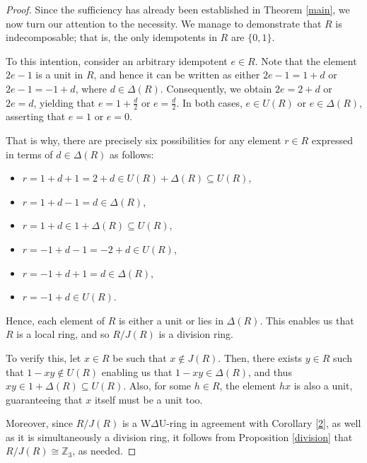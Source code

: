 \documentclass[10pt,a4paper]{amsart}
\begin{document}
\begin{proof}
Since the sufficiency has already been established in Theorem \ref{main}, we now turn our attention to the necessity. We manage to demonstrate that \( R \) is indecomposable; that is, the only idempotents in \( R \) are \( \{0, 1\} \).

To this intention, consider an arbitrary idempotent \( e \in R \). Note that the element \( 2e - 1 \) is a unit in \( R \), and hence it can be written as either \( 2e - 1 = 1 + d \) or \( 2e - 1 = -1 + d \), where \( d \in \Delta(R) \). Consequently, we obtain \( 2e = 2 + d \) or \( 2e = d \), yielding that \( e = 1 + \frac{d}{2} \) or \( e = \frac{d}{2} \). In both cases, \( e \in U(R) \) or \( e \in \Delta(R) \), asserting that \( e = 1 \) or \( e = 0 \).

That is why, there are precisely six possibilities for any element \( r \in R \) expressed in terms of \( d \in \Delta(R) \) as follows:

\medskip

\begin{itemize}
	\item \( r = 1 + d + 1 = 2 + d \in U(R) + \Delta(R) \subseteq U(R) \),
	\item \( r = 1 + d - 1 = d \in \Delta(R) \),
	\item \( r = 1 + d \in 1 + \Delta(R) \subseteq U(R) \),
	\item \( r = -1 + d - 1 = -2 + d \in U(R) \),
	\item \( r = -1 + d + 1 = d \in \Delta(R) \),
	\item \( r = -1 + d \in U(R) \).
\end{itemize}

\medskip

Hence, each element of \( R \) is either a unit or lies in \( \Delta(R) \). This enables us that \( R \) is a local ring, and so \( R/J(R) \) is a division ring.

To verify this, let \( x \in R \) be such that \( x \not\in J(R) \). Then, there exists \( y \in R \) such that \( 1 - xy \not\in U(R) \) enabling us that \( 1 - xy \in \Delta(R) \), and thus \( xy \in 1 + \Delta(R) \subseteq U(R) \). Also, for some \( h \in R \), the element \( hx \) is also a unit, guaranteeing that \( x \) itself must be a unit too.

Moreover, since \( R/J(R) \) is a W\(\Delta\)U-ring in agreement with Corollary \ref{2}, as well as it is simultaneously a division ring, it follows from Proposition \ref{division} that \( R/J(R) \cong \mathbb{Z}_3 \), as needed.
\end{proof}
\end{document}
